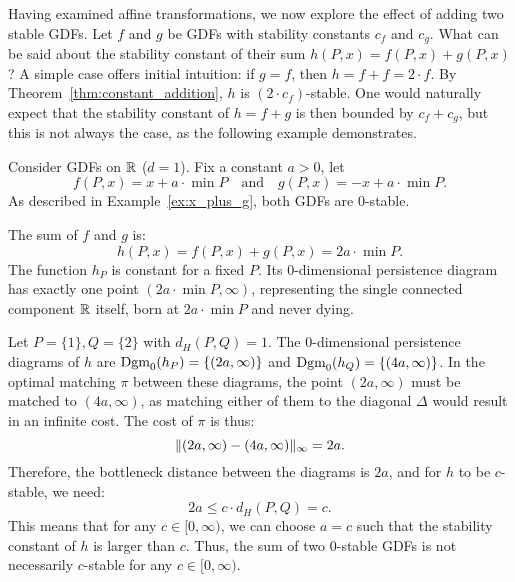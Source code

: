 Having examined affine transformations, we now explore the effect of adding two
stable GDFs.
Let $f$ and $g$ be GDFs with stability constants $c_f$ and $c_g$.
What can be said about the stability constant of their sum
$h(P, x) = f(P, x) + g(P, x)$?
A simple case offers initial intuition:
if $g = f$, then $h = f + f = 2 \cdot f$.
By Theorem~\ref{thm:constant_addition}, $h$ is $(2 \cdot c_f)$-stable.
One would naturally expect that the stability constant of
$h = f + g$ is then bounded by $c_f + c_g$, but this is not always the case,
as the following example demonstrates.
\begin{example}
    Consider GDFs on $\mathbb{R}$ ($d = 1$).
    Fix a constant $a > 0$, let
    \begin{equation}
        f(P, x) = x + a \cdot \min P \quad \text{and} \quad g(P, x) = - x + a \cdot \min P.
    \end{equation}
    As described in Example~\ref{ex:x_plus_g}, both GDFs are $0$-stable.

    The sum of $f$ and $g$ is:
    \begin{equation}
        h(P, x) = f(P, x) + g(P, x) = 2a \cdot \min P.
    \end{equation}
    The function $h_P$ is constant for a fixed $P$.
    Its 0-dimensional persistence diagram has exactly one point
    $(2a \cdot \min P, \infty)$, representing the single connected component
    $\mathbb{R}$ itself, born at $2a \cdot \min P$ and never dying.
    
    Let $P = \{1\}, Q = \{2\}$ with $d_H(P, Q) = 1$.
    The 0-dimensional persistence diagrams of $h$ are
    $\operatorname{Dgm}_0(h_P) = \{(2a, \infty)\}$ and $\operatorname{Dgm}_0(h_Q) = \{(4a, \infty)\}$.
    In the optimal matching $\pi$ between these diagrams, the point $(2a, \infty)$
    must be matched to $(4a, \infty)$, as matching either of them to the
    diagonal $\Delta$ would result in an infinite cost.
    The cost of $\pi$ is thus:
    \begin{equation}
        \lVert(2a, \infty) - (4a, \infty)\rVert_\infty = 2a.
    \end{equation}
    Therefore, the bottleneck distance between the diagrams is $2a$,
    and for $h$ to be $c$-stable, we need:
    \begin{equation}
        2a \leq c \cdot d_H(P, Q) = c.
    \end{equation}
    This means that for any $c \in [0, \infty)$, we can choose $a = c$ such that
    the stability constant of $h$ is larger than $c$.
    Thus, the sum of two $0$-stable GDFs is not necessarily $c$-stable for
    any $c \in [0, \infty)$.
\end{example}

